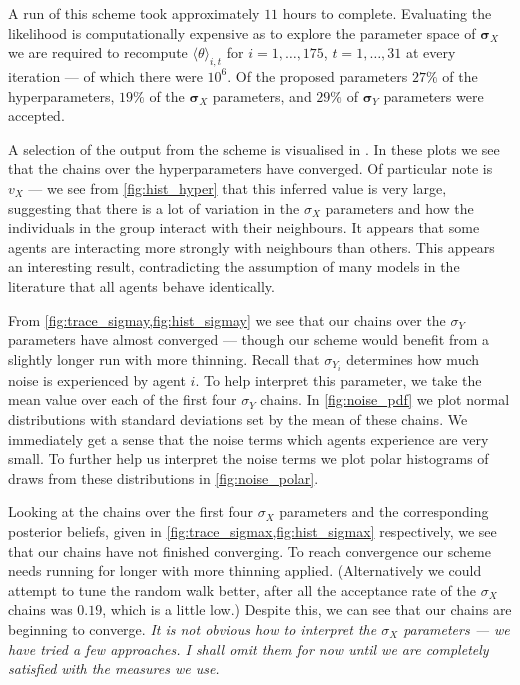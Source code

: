 A run of this scheme took approximately $11$ hours to complete. Evaluating the likelihood is 
computationally expensive as to explore the parameter space of $\bm{\sigma}_X$ we are required to 
recompute $\langle \theta \rangle_{i, t}$ for $i=1,\ldots,175$, $t=1,\ldots,31$ at every iteration 
--- of which there were $10^6$. Of the proposed parameters $27\%$ of the hyperparameters, $19\%$ of 
the $\bm{\sigma}_X$ parameters, and $29\%$ of $\bm{\sigma}_Y$ parameters were accepted.

A selection of the output from the scheme is visualised in 
. In these plots we see that the chains over the 
hyperparameters have converged. Of particular note is $v_X$ --- we see from \cref{fig:hist_hyper} 
that this inferred value is very large, suggesting that there is a lot of variation in the $\sigma_X$ 
parameters and how the individuals in the group interact with their neighbours. It appears that some 
agents are interacting more strongly with neighbours than others. This appears an interesting result, 
contradicting the assumption of many models in the literature that all agents behave identically.

From \cref{fig:trace_sigmay,fig:hist_sigmay} we see that our chains over the $\sigma_Y$ parameters 
have almost converged --- though our scheme would benefit from a slightly longer run with more 
thinning. Recall that $\sigma_{Y_i}$ determines how much noise is experienced by agent $i$. To help 
interpret this parameter, we take the mean value over each of the first four $\sigma_Y$ chains. In 
\cref{fig:noise_pdf} we plot normal distributions with standard deviations set by the mean of these 
chains. We immediately get a sense that the noise terms which agents experience are very small. To 
further help us interpret the noise terms we plot polar histograms of draws from these distributions 
in \cref{fig:noise_polar}.

Looking at the chains over the first four $\sigma_X$ parameters and the corresponding posterior 
beliefs, given in \cref{fig:trace_sigmax,fig:hist_sigmax} respectively, we see that our chains have 
not finished converging. To reach convergence our scheme needs running for longer with more thinning 
applied. (Alternatively we could attempt to tune the random walk better, after all the acceptance 
rate of the $\sigma_X$ chains was $0.19$, which is a little low.)  Despite this, we can see that our 
chains are beginning to converge. \emph{It is not obvious how to interpret the $\sigma_X$ parameters 
--- we have tried a few approaches. I shall omit them for now until we are completely satisfied with 
the measures we use.}

